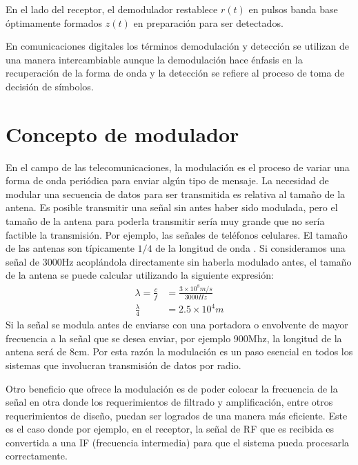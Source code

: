 En el lado del receptor, el demodulador restablece $r(t)$ en pulsos banda base
\'optimamente formados $z(t)$ en preparaci\'on para ser detectados.

En comunicaciones digitales los t\'erminos demodulaci\'on y detecci\'on se utilizan de una manera intercambiable \cite{sklar}
aunque la demodulaci\'on hace \'enfasis en la recuperaci\'on de la forma de onda y la detecci\'on se refiere al proceso de toma de
decisi\'on de s\'imbolos.

\section{Concepto de modulador}

En el campo de las telecomunicaciones, la modulaci\'on es el proceso de variar
una forma de onda peri\'odica para enviar alg\'un tipo de mensaje\cite{sklar}. La necesidad
de modular una secuencia de datos para ser transmitida es relativa al tama\~no de
la antena. Es posible transmitir una se\~nal sin antes haber sido modulada, pero
el tama\~no de la antena para poderla transmitir ser\'ia muy grande que no
ser\'ia factible la transmisi\'on. Por ejemplo, las se\~nales de tel\'efonos
celulares. El tama\~no de las antenas son t\'ipicamente $1/4$ de la longitud de onda
\cite{sklar}. Si consideramos una se\~nal de 3000Hz acopl\'andola directamente
sin haberla modulado antes, el tama\~no de la antena se puede calcular
utilizando la siguiente expresi\'on:
\begin{equation}
\begin{aligned}
\lambda=\frac{c}{f}&=\frac{3\times10^8m/s}{3000Hz}\\
\frac{\lambda}{4}&=2.5\times10^4m
\end{aligned}
\end{equation}
Si la se\~nal se modula antes de enviarse con una portadora o envolvente de
mayor frecuencia a la se\~nal que se desea enviar, por ejemplo 900Mhz, la longitud de la antena ser\'a de 8cm. Por esta raz\'on
la modulaci\'on es un paso esencial en todos los sistemas que involucran transmisi\'on de datos por
radio.

Otro beneficio que ofrece la modulaci\'on es de poder colocar la frecuencia de la se\~nal en otra
donde los requerimientos de filtrado y amplificaci\'on, entre otros requerimientos de dise\~no,
puedan ser logrados de una manera m\'as eficiente. Este es el caso donde por ejemplo, en el receptor,
la se\~nal de RF que es recibida es convertida a una IF (frecuencia intermedia) para que el sistema
pueda procesarla correctamente.

